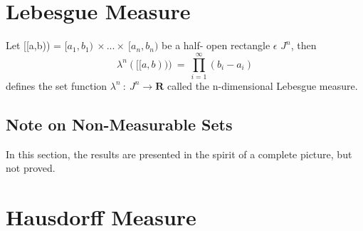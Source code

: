 \section{Lebesgue Measure}
\begin{definition}
    Let [[a,b)) = $[a_1,b_1) \: \times...\times \: [a_n,b_n)$ be a half- open
    rectangle $\epsilon$ $J^n$, then
    \[
        \lambda^n([[a,b))) \: = \: \prod_{i=1}^{\infty}(b_i - a_i)
    \]
        defines the set function $\lambda^n \: : \: J^n \rightarrow \bm{R}$
        called the n-dimensional Lebesgue measure.
\end{definition}

\subsection{Note on Non-Measurable Sets}
In this section, the results are presented in the spirit of a complete picture,
but not proved.


\section{Hausdorff Measure}
